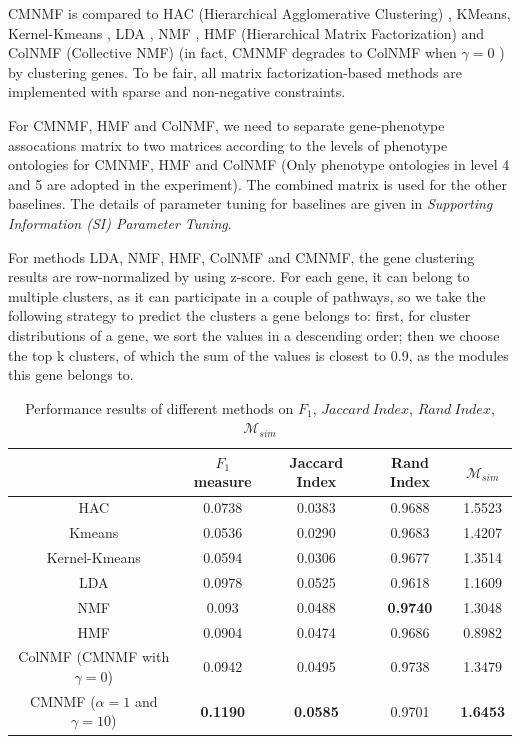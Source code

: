 \documentclass{bmcart}
\begin{document}
CMNMF is compared to HAC (Hierarchical Agglomerative Clustering) \cite{Ward1963}, KMeans, Kernel-Kmeans \cite{Dhillon2004}, LDA \cite{Blei2003}, NMF \cite{Lee1999}, HMF (Hierarchical Matrix Factorization) \cite{AliMashhoori2012} and ColNMF (Collective NMF) \cite{Singh2008} (in fact, CMNMF degrades to ColNMF when $\gamma=0$ ) by clustering genes. To be fair, all matrix factorization-based methods are implemented with sparse and non-negative constraints.

For CMNMF, HMF and ColNMF, we need to separate gene-phenotype assocations matrix to two matrices according to the levels of phenotype ontologies for CMNMF, HMF and ColNMF (Only phenotype ontologies in level 4 and 5 are adopted in the experiment). The combined matrix is used for the other baselines. The details of parameter tuning for baselines are given in {\emph{Supporting Information (SI) Parameter Tuning}}.

For methods LDA, NMF, HMF, ColNMF and CMNMF, the gene clustering results are row-normalized by using z-score. For each gene, it can belong to multiple clusters, as it can participate in a couple of pathways, so we take the following strategy to predict the clusters a gene belongs to: first, for cluster distributions of a gene, we sort the values in a descending order; then we choose the top k clusters, of which the sum of the values is closest to 0.9, as the modules this gene belongs to.

\begin{table}[!t]
\centering
\caption{Performance results of different methods on $F_1$, $Jaccard\ Index$, $Rand\ Index$, $\mathcal{M}_{sim}$}\label{tab:measurements}
\begin{tabular}{c|cccc}
\hline
&$F_1$ measure &Jaccard Index& Rand Index&$\mathcal{M}_{sim}$\\
\hline
HAC&0.0738&0.0383&0.9688&1.5523\\
Kmeans&0.0536&0.0290&0.9683&1.4207\\
Kernel-Kmeans&0.0594&0.0306&0.9677&1.3514\\
LDA&0.0978&0.0525&0.9618&1.1609\\
NMF&0.093&0.0488&\textbf{0.9740}&1.3048\\
HMF&0.0904&0.0474&0.9686&0.8982\\
ColNMF (CMNMF with $\gamma=0$)&0.0942&0.0495&0.9738&1.3479\\
CMNMF ($\alpha=1$ and $\gamma=10$)&\textbf{0.1190}& \textbf{0.0585}&{0.9701}& \textbf{1.6453}\\
\hline
\end{tabular}
\end{table}
\end{document}

